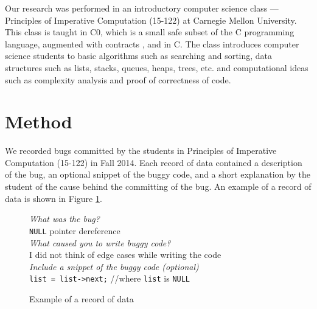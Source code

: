 \documentclass{sig-alternate}
\begin{document}
Our research was performed in an introductory computer science class --- Principles of Imperative Computation (15-122) at Carnegie Mellon University. This class is taught in C0, which is a small safe subset of the C programming language, augmented with contracts \cite{Arnold10, PfenningCortinaLovas11}, and in C. The class introduces computer science students to basic algorithms such as searching and sorting, data structures such as lists, stacks, queues, heaps, trees, etc. and computational ideas such as complexity analysis and proof of correctness of code.


\section{Method}
\label{sec:method}

We recorded bugs committed by the students in Principles of Imperative Computation (15-122) in Fall 2014. Each record of data contained a description of the bug, an optional snippet of the buggy code, and a short explanation by the student of the cause behind the committing of the bug. An example of a record of data is shown in Figure \ref{fig:record}.\\

\begin{figure}
\begin{framed}
\emph{What was the bug?}\\
\verb|NULL| pointer dereference\\

\emph{What caused you to write buggy code?}\\
 I did not think of edge cases while writing the code\\

\emph{Include a snippet of the buggy code (optional)}\\
\verb|list = list->next;| //where \verb|list| is \verb|NULL|
\end{framed}
\caption{Example of a record of data}
\label{fig:record}
\end{figure}
\end{document}
